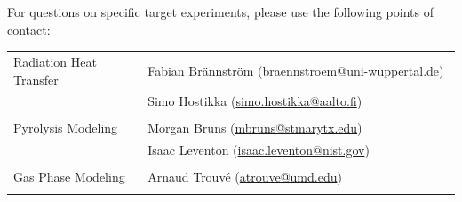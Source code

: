 \documentclass[12pt]{article}
\begin{document}

\noindent For questions on specific target experiments, please use the following points of contact:
\begin{table}[htb]
\begin{tabular}{|p{0.3\linewidth} | p{0.7\linewidth}|}
\hline
Radiation Heat Transfer           &  Fabian Brännström (\href{mailto:braennstroem@uni-wuppertal.de}{braennstroem@uni-wuppertal.de})\\
& Simo Hostikka (\href{mailto:simo.hostikka@aalto.fi}{simo.hostikka@aalto.fi})\\
&\\
\hline
Pyrolysis Modeling & Morgan Bruns (\href{mailto:mbruns@stmarytx.edu}{mbruns@stmarytx.edu})\\
& Isaac Leventon (\href{mailto:isaac.leventon@nist.gov}{isaac.leventon@nist.gov})\\
&\\
\hline
Gas Phase Modeling &Arnaud Trouv\'e (\href{mailto:atrouve@umd.edu}{atrouve@umd.edu})\\
& \\
\hline

\end{tabular}
\end{table}

\clearpage

\end{document}
